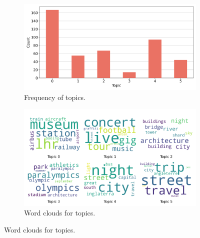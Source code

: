 \documentclass{article}
\theoremstyle{remark}
\begin{document}
\begin{figure}[!h]
    \centering
    \begin{subfigure}{0.45\textwidth}
        \centering
        \includegraphics[width=\linewidth]{figures/places_sense_nighttime_tourists.png} 
        \caption{Frequency of topics.}
        \label{fig:places_sense_nighttime_tourists}
    \end{subfigure}
    \hfill
    \begin{subfigure}{0.5\textwidth}
        \centering
        \includegraphics[width=\linewidth]{figures/topics_nighttime_tourists.png} 
        \caption{Word clouds for topics.}
        \label{fig:topics_nighttime_tourists}
    \end{subfigure}
    

\end{figure}
\end{document}
